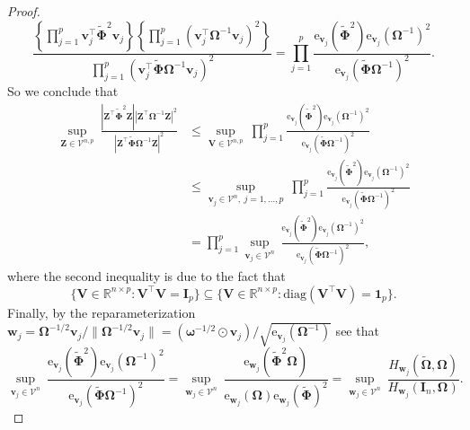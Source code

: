 \documentclass[12pt]{article}
\newcommand{\bl}[1]{{\mathbf #1}}
\newcommand{\bs}[1]{\boldsymbol #1}
\begin{document}
\begin{proof}
\begin{equation*}
    \frac{\left\{ \prod_{j=1}^p \bl{v}_j^\top \tilde{\bs{\Phi}}^2 \bl{v}_j  \right\}\left\{ \prod_{j=1}^p (\bl{v}_j^\top \bs{\Omega}^{-1} \bl{v}_j )^2 \right\}}{\prod_{j=1}^p (\bl{v}_j^\top \tilde{\bs{\Phi}} \bs{\Omega}^{-1} \bl{v}_j )^2} = \prod_{j=1}^p \frac{\mathrm{e}_{\bl{v}_j}(\tilde{\bs{\Phi}}^2) \mathrm{e}_{\bl{v}_j}(\bs{\Omega}^{-1})^2}{\mathrm{e}_{\bl{v}_j}(\tilde{\bs{\Phi}} \bs{\Omega}^{-1})^2}.
\end{equation*}
So we conclude that
\begin{equation*}
\begin{aligned}
    \underset{\bl{Z} \in \mathcal{V}^{n,p}}{\sup}~\frac{|\bl{Z}^\top \tilde{\bs{\Phi}}^2 \bl{Z}||\bl{Z}^\top \bs{\Omega}^{-1} \bl{Z}|^2}{|\bl{Z}^\top \tilde{\bs{\Phi}} \bs{\Omega}^{-1}\bl{Z}|^2} &\leq \underset{\bl{V} \in \mathcal{V}^{n,p}}{\sup}~ \prod_{j=1}^p \frac{\mathrm{e}_{\bl{v}_j}(\tilde{\bs{\Phi}}^2) \mathrm{e}_{\bl{v}_j}(\bs{\Omega}^{-1})^2}{\mathrm{e}_{\bl{v}_j}(\tilde{\bs{\Phi}} \bs{\Omega}^{-1})^2} \\
    &\leq \underset{\bl{v}_j \in \mathcal{V}^n,~j=1,\dots,p}{\sup}~ \prod_{j=1}^p \frac{\mathrm{e}_{\bl{v}_j}(\tilde{\bs{\Phi}}^2) \mathrm{e}_{\bl{v}_j}(\bs{\Omega}^{-1})^2}{\mathrm{e}_{\bl{v}_j}(\tilde{\bs{\Phi}} \bs{\Omega}^{-1})^2} \\
    &= \prod_{j=1}^p \underset{\bl{v}_j \in \mathcal{V}^n}{\sup}~ \frac{\mathrm{e}_{\bl{v}_j}(\tilde{\bs{\Phi}}^2) \mathrm{e}_{\bl{v}_j}(\bs{\Omega}^{-1})^2}{\mathrm{e}_{\bl{v}_j}(\tilde{\bs{\Phi}} \bs{\Omega}^{-1})^2},
\end{aligned}
\end{equation*}
where the second inequality is due to the fact that 
\begin{equation*}
    \{ \bl{V} \in \mathbb{R}^{n \times p} : \bl{V}^\top \bl{V} = \bl{I}_p\} \subseteq \{ \bl{V} \in \mathbb{R}^{n \times p} : \mathrm{diag}(\bl{V}^\top \bl{V}) = \bl{1}_p\}.
\end{equation*}
Finally, by the reparameterization $\bl{w}_j = \bs{\Omega}^{-1/2} \bl{v}_j / \|\bs{\Omega}^{-1/2} \bl{v}_j\| = (\bs{\omega}^{-1/2} \odot \bl{v}_j) / \sqrt{\mathrm{e}_{\bl{v}_j}(\bs{\Omega}^{-1})}$ see that
\begin{equation*}
    \underset{\bl{v}_j \in \mathcal{V}^n}{\sup}~\frac{\mathrm{e}_{\bl{v}_j}(\tilde{\bs{\Phi}}^2) \mathrm{e}_{\bl{v}_j}(\bs{\Omega}^{-1})^2}{\mathrm{e}_{\bl{v}_j}(\tilde{\bs{\Phi}} \bs{\Omega}^{-1})^2} = \underset{\bl{w}_j \in \mathcal{V}^n}{\sup}~ \frac{\mathrm{e}_{\bl{w}_j}(\tilde{\bs{\Phi}}^2 \bs{\Omega})}{\mathrm{e}_{\bl{w}_j}(\bs{\Omega}) \mathrm{e}_{\bl{w}_j}(\tilde{\bs{\Phi}})^2} = \underset{\bl{w}_j \in \mathcal{V}^n}{\sup}~\frac{H_{\bl{w}_j}(\tilde{\bs{\Omega}}, \bs{\Omega})}{H_{\bl{w}_j}(\bl{I}_n, \bs{\Omega})}.

\end{equation*}
\end{proof}
\end{document}
